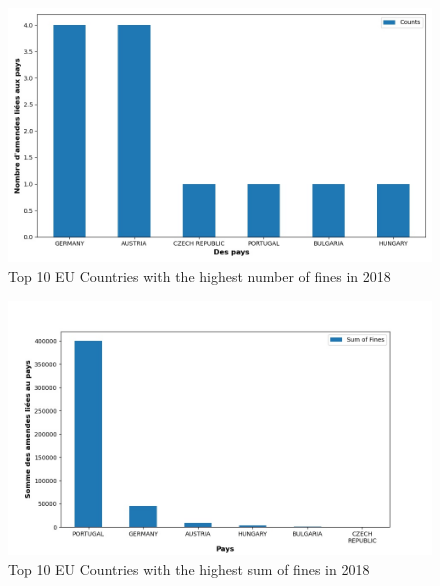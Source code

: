 \documentclass[12pt]{article}
\begin{document}
	\begin{figure}
		[H]\centering\includegraphics[scale=.5]{graphs/top10_countries_year}
		\caption{Top 10 EU Countries with the highest number of fines in 2018}
	\end{figure}
	\begin{figure}
		[H]\centering\includegraphics[scale=.5]{graphs/top10_countries_year_fines}
		\caption{Top 10 EU Countries with the highest sum of fines in 2018}
	\end{figure}
\end{document}
